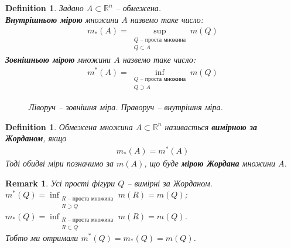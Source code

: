 \documentclass[a4paper, 10pt]{article}
\theoremstyle{theoremdd}
\theoremstyle{theoremdd}
\newtheorem{definition}[theorem]{Definition}
\theoremstyle{theoremdd}
\theoremstyle{theoremdd}
\theoremstyle{theoremdd}
\theoremstyle{theoremdd}
\theoremstyle{theoremdd}
\theoremstyle{theoremdd}
\theoremstyle{theoremdd}
\theoremstyle{theoremdd}
\theoremstyle{theoremdd}
\newtheorem{remark}[theorem]{Remark}
\theoremstyle{theoremdd}
\theoremstyle{theoremdd}
\theoremstyle{theoremdd}
\theoremstyle{theoremdd}
\begin{document}
\begin{definition}
Задано $A \subset \mathbb{R}^n$ -- обмежена.\\
\textbf{Внутрішньою мірою} множини $A$ назвемо таке число:
\begin{align*}
m_*(A) = \sup_{\substack{Q \text{ -- проста множина} \\ Q \subset A}} m(Q)
\end{align*}
\textbf{Зовнішньою мірою} множини $A$ назвемо таке число:
\begin{align*}
m^*(A) = \inf_{\substack{Q \text{ -- проста множина} \\ Q \supset A}} m(Q)
\end{align*}
\begin{figure}[H]
\centering
{}
\qquad
{}

\caption*{Ліворуч -- зовнішня міра. Праворуч -- внутрішня міра.}
\end{figure}
\end{definition}

\begin{definition}
Обмежена множина $A \subset \mathbb{R}^n$ називається \textbf{вимірною за Жорданом}, якщо
\begin{align*}
m_*(A) = m^*(A)
\end{align*}
Тоді обидві міри позначимо за $m(A)$, що буде \textbf{мірою Жордана} множини $A$.
\end{definition}

\begin{remark}
Усі прості фігури $Q$ -- вимірні за Жорданом.\\
$m^*(Q) = \displaystyle\inf_{\substack{R \text{ -- проста множина} \\ R \supset Q}} m(R) = m(Q)$;\\
$m_*(Q) = \displaystyle\inf_{\substack{R \text{ -- проста множина} \\ R \subset Q}} m(R) = m(Q)$.\\
Тобто ми отримали $m^*(Q) = m_*(Q) = m(Q)$.
\end{remark}
\end{document}
